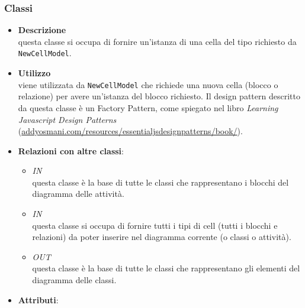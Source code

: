 \subsubsection{Classi}
\label{\nogloxy{swedesigner::client::model::NewCellFactory}}
\begin{figure}[h]
\centering
{}
\caption{}
\end{figure}
\FloatBarrier
\begin{itemize}
\item \textbf{Descrizione}\\
questa classe si occupa di fornire un'istanza di una cella del tipo richiesto da \texttt{NewCellModel}. 
\item \textbf{Utilizzo}\\
viene utilizzata da \texttt{NewCellModel} che richiede una nuova cella (blocco o relazione) per avere un'istanza del blocco richiesto. Il design pattern descritto da questa classe è un Factory Pattern, come spiegato nel libro \emph{Learning Javascript Design Patterns} (\url{addyosmani.com/resources/essentialjsdesignpatterns/book/}).
\item \textbf{Relazioni con altre classi}:
\begin{itemize}
\item \textit{IN} \hyperref[\nogloxy{swedesigner::client::model::celltypes::activity::ActivityDiagramElement}]{}\\
questa classe è la base di tutte le classi che rappresentano i blocchi del diagramma delle attività.
\item \textit{IN} \hyperref[\nogloxy{swedesigner::client::model::NewCellModel}]{}\\
questa classe si occupa di fornire tutti i tipi di cell (tutti i blocchi e relazioni) da poter inserire nel diagramma corrente (o classi o attività).
\item \textit{OUT} \hyperref[\nogloxy{swedesigner::client::model::celltypes::class::ClassDiagramElement}]{}\\
questa classe è la base di tutte le classi che rappresentano gli elementi del diagramma delle classi.
\end{itemize}
\item \textbf{Attributi}:
\begin{itemize}

\end{itemize}
\end{itemize}
